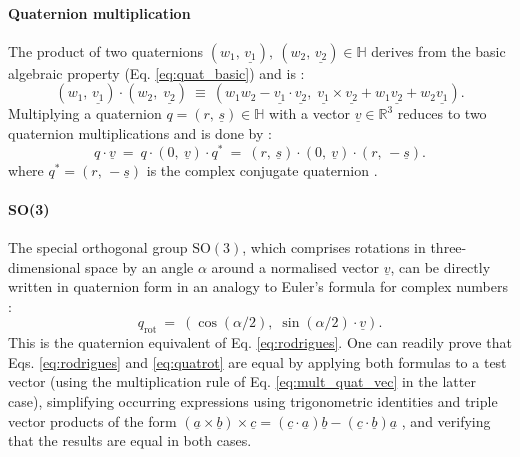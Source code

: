 \paragraph{Quaternion multiplication}
The product of two quaternions $\left( w_1,\,\underline{v_1} \right),\ \left( w_2,\,\underline{v_2} \right) \in \mathbb{H}$ 
derives from the basic algebraic property (Eq. \ref{eq:quat_basic}) and is \cite[pp. 106-110]{Kuipers2002}:
\begin{equation}
	\left( w_1, \,\underline{v_1} \right) \cdot \left( w_2, \;\underline{v_2} \right) \ \equiv \ 
	\left( w_1 w_2 - \underline{v_1} \cdot \underline{v_2}, \;\underline{v_1} \times \underline{v_2} + w_1 \underline{v_2} + w_2 \underline{v_1}\right).
\end{equation}
Multiplying a quaternion $q = \left( r,\, \underline{s} \right) \in \mathbb{H}$ with a vector 
$\underline{v} \in \mathbb{R}^3$  reduces to two quaternion multiplications and is done by \cite[p. 127]{Kuipers2002}:
\begin{equation}
	q \cdot \underline{v} \ =\ 
	q \cdot \left(0,\ \underline{v} \right) \cdot q^{*} \ =\ 
	\left( r,\, \underline{s} \right) \cdot \left(0,\ \underline{v} \right) \cdot \left( r,\, -\underline{s} \right).
	\label{eq:mult_quat_vec}
\end{equation}
where $q^{*} = \left( r,\, -\underline{s} \right)$ is the complex conjugate quaternion \cite[pp. 110-111]{Kuipers2002}.

\paragraph{SO(3)}
The special orthogonal group $\mathrm{SO\left(3\right)}$, which comprises rotations in three-dimensional space by an angle
$\alpha$ around a normalised vector $\underline{v}$, can be directly written in quaternion form in an analogy to 
Euler's formula for complex numbers \cite{wiki_quatrot}:
\begin{equation}
	\boxed{
	q_{\mathrm{rot}} \ =\ \left(\cos\left(\alpha/2 \right),\; \sin\left(\alpha/2 \right) \cdot \underline{v} \right).
	}
	\label{eq:quatrot}
\end{equation}
This is the quaternion equivalent of Eq. \ref{eq:rodrigues}. One can readily prove that Eqs. \ref{eq:rodrigues} and \ref{eq:quatrot} are equal by applying both formulas to a test vector (using the multiplication rule of Eq.
\ref{eq:mult_quat_vec} in the  latter case), simplifying occurring expressions using trigonometric 
identities \cite{wiki_trig} and triple vector products of the form 
$\left(\underline{a} \times \underline{b}\right) \times \underline{c} = 
	\left( \underline{c}\cdot \underline{a} \right) \underline{b} - 
	\left( \underline{c}\cdot \underline{b} \right) \underline{a}$ \cite{wiki_tripleprod},
and verifying that the results are equal in both cases.



